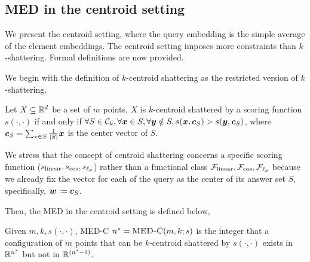 \subsection{MED in the centroid setting}\label{sec:maed}
We present the centroid setting, where the query embedding is the simple average of the element embeddings. The centroid setting imposes more constraints than $k$-shattering. Formal definitions are now provided.

We begin with the definition of $k$-centroid shattering as the restricted version of $k$-shattering.
\begin{definition}
    Let $X\subseteq \mathbb{R}^d$ be a set of $m$ points, $X$ is $k$-centroid shattered by a scoring function $s(\cdot, \cdot)$ if and only if $\forall S\in \mathcal{C}_k, \forall \bm{x}\in S, \forall \bm{y} \notin S, s(\bm{x}, \bm{c}_S) > s(\bm{y}, \bm{c}_S)$, where $\bm{c}_S = \sum_{x \in S} \frac{1}{|S|}\bm{x}$ is the center vector of $S$.
\end{definition}
\begin{remark}
    We stress that the concept of centroid shattering concerns a specific scoring function ($s_{\rm linear}, s_{\cos}, s_{\ell_p}$) rather than a functional class $\mathcal{F}_{\rm linear}, \mathcal{F}_{\cos}, \mathcal{F}_{\ell_p}$ because we already fix the vector for each of the query as the center of its answer set $S$, specifically, $\bm{w}:= \bm{c}_S$.
\end{remark}

Then, the MED in the centroid setting is defined below,
\begin{definition}
    Given $m, k, s(\cdot, \cdot)$, MED-C $n^* = \textsc{MED-C}(m, k; s)$ is the integer that a configuration of $m$ points that can be $k$-centroid shattered by $s(\cdot, \cdot)$ exists in $\mathbb{R}^{n^*}$ but not in $\mathbb{R}^{(n^*-1)}$.
\end{definition}

